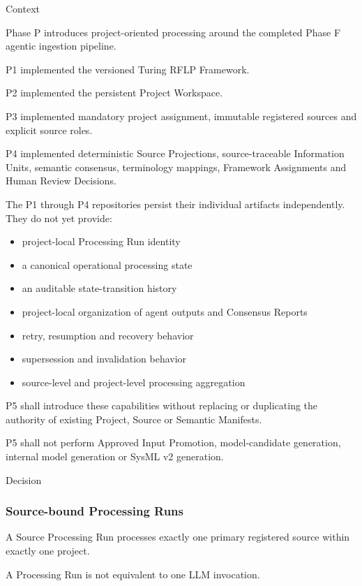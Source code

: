 Context

Phase P introduces project-oriented processing around the completed Phase F agentic ingestion pipeline.

P1 implemented the versioned Turing RFLP Framework.

P2 implemented the persistent Project Workspace.

P3 implemented mandatory project assignment, immutable registered sources and explicit source roles.

P4 implemented deterministic Source Projections, source-traceable Information Units, semantic consensus, terminology mappings, Framework Assignments and Human Review Decisions.

The P1 through P4 repositories persist their individual artifacts independently. They do not yet provide:

\begin{itemize}
\tightlist
\item
  project-local Processing Run identity
\item
  a canonical operational processing state
\item
  an auditable state-transition history
\item
  project-local organization of agent outputs and Consensus Reports
\item
  retry, resumption and recovery behavior
\item
  supersession and invalidation behavior
\item
  source-level and project-level processing aggregation
\end{itemize}

P5 shall introduce these capabilities without replacing or duplicating the authority of existing Project, Source or Semantic Manifests.

P5 shall not perform Approved Input Promotion, model-candidate generation, internal model generation or SysML v2 generation.

Decision

\hypertarget{source-bound-processing-runs}{%
\subsubsection{Source-bound Processing Runs}\label{source-bound-processing-runs}}

A Source Processing Run processes exactly one primary registered source within exactly one project.

A Processing Run is not equivalent to one LLM invocation.


